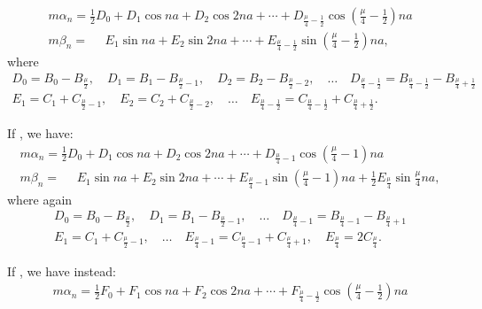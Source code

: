 \begin{landscape}
\[
\tag*{1)}
\begin{array}{l}
m\alpha_n = \tfrac{1}{2}D_0 + D_1\cos na + D_2\cos 2na + \cdots + D_{\frac{\mu}{4}-\frac{1}{2}}\cos\left(\frac{\mu}{4}-\frac{1}{2}\right)na \\[4pt]
m\beta_n = \phantom{{}={}} E_1\sin na + E_2\sin 2na + \cdots + E_{\frac{\mu}{4}-\frac{1}{2}}\sin\left(\frac{\mu}{4}-\frac{1}{2}\right)na,
\end{array}
\]
where
\[
\begin{gathered}
D_0 = B_0 - B_{\frac{\mu}{2}}, \quad D_1 = B_1 - B_{\frac{\mu}{2}-1}, \quad D_2 = B_2 - B_{\frac{\mu}{2}-2}, \quad \ldots \quad D_{\frac{\mu}{4}-\frac{1}{2}} = B_{\frac{\mu}{4}-\frac{1}{2}} - B_{\frac{\mu}{4}+\frac{1}{2}}\\[4pt]
E_1 = C_1 + C_{\frac{\mu}{2}-1}, \quad E_2 = C_2 + C_{\frac{\mu}{2}-2}, \quad \ldots \quad E_{\frac{\mu}{4}-\frac{1}{2}} = C_{\frac{\mu}{4}-\frac{1}{2}} + C_{\frac{\mu}{4}+\frac{1}{2}}.
\end{gathered}
\]
\par\noindent\hspace*{\parindent}If , we have:
\[
\tag*{2)}
\begin{array}{l}
m\alpha_n = \tfrac{1}{2}D_0 + D_1\cos na + D_2\cos 2na + \cdots + D_{\frac{\mu}{4}-1}\cos\left(\frac{\mu}{4}-1\right)na \\[4pt]
m\beta_n = \phantom{{}={}} E_1\sin na + E_2\sin 2na + \cdots + E_{\frac{\mu}{4}-1}\sin\left(\frac{\mu}{4}-1\right)na + \tfrac{1}{2}E_{\frac{\mu}{4}}\sin\frac{\mu}{4}na,
\end{array}
\]
where again
\[
\begin{gathered}
D_0 = B_0 - B_{\frac{\mu}{2}}, \quad D_1 = B_1 - B_{\frac{\mu}{2}-1}, \quad \ldots \quad D_{\frac{\mu}{4}-1} = B_{\frac{\mu}{4}-1} - B_{\frac{\mu}{4}+1}\\[4pt]
E_1 = C_1 + C_{\frac{\mu}{2}-1}, \quad \ldots \quad E_{\frac{\mu}{4}-1} = C_{\frac{\mu}{4}-1} + C_{\frac{\mu}{4}+1}, \quad E_{\frac{\mu}{4}} = 2C_{\frac{\mu}{4}}.
\end{gathered}
\]
\par\noindent\hspace*{\parindent}If , we have instead:
\[
\tag*{3)}
\begin{array}{l}
m\alpha_n = \tfrac{1}{2}F_0 + F_1\cos na + F_2\cos 2na + \cdots + F_{\frac{\mu}{4}-\frac{1}{2}}\cos\left(\frac{\mu}{4}-\frac{1}{2}\right)na \\[4pt]

\end{array}\]
\end{landscape}
